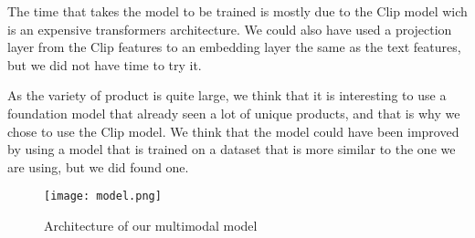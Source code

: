 The time that takes the model to be trained is mostly due to the Clip model wich is an expensive transformers architecture. We could also have used a projection layer from the Clip features to an embedding layer the same as the text features, but we did not have time to try it.

As the variety of product is quite large, we think that it is interesting to use a foundation model that already seen a lot of unique products, and that is why we chose to use the Clip model. We think that the model could have been improved by using a model that is trained on a dataset that is more similar to the one we are using, but we did found one.

\begin{figure}[H]
    \centering
    \texttt{[image: model.png]}
    \caption{Architecture of our multimodal model}
    \label{fig:model}
\end{figure}